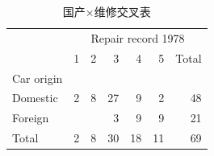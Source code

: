 \begin{table}[htbp]
  \centering
  \caption{ 国产×维修交叉表 }
  \label{tab:tab2d}
  \small
  \begin{tabular}{lllllll}
    \toprule
    \multicolumn{1}{c}{} &
      \multicolumn{6}{c}{Repair record 1978} \\
    \multicolumn{1}{c}{} &
      \multicolumn{1}{r}{1} &
      \multicolumn{1}{r}{2} &
      \multicolumn{1}{r}{3} &
      \multicolumn{1}{r}{4} &
      \multicolumn{1}{r}{5} &
      \multicolumn{1}{r}{Total} \\
    \midrule
    \multicolumn{1}{l}{Car origin} &
      \multicolumn{1}{r}{} &
      \multicolumn{1}{r}{} &
      \multicolumn{1}{r}{} &
      \multicolumn{1}{r}{} &
      \multicolumn{1}{r}{} &
      \multicolumn{1}{r}{} \\
    \multicolumn{1}{l}{\hspace{1em}Domestic} &
      \multicolumn{1}{r}{2} &
      \multicolumn{1}{r}{8} &
      \multicolumn{1}{r}{27} &
      \multicolumn{1}{r}{9} &
      \multicolumn{1}{r}{2} &
      \multicolumn{1}{r}{48} \\
    \multicolumn{1}{l}{\hspace{1em}Foreign} &
      \multicolumn{1}{r}{} &
      \multicolumn{1}{r}{} &
      \multicolumn{1}{r}{3} &
      \multicolumn{1}{r}{9} &
      \multicolumn{1}{r}{9} &
      \multicolumn{1}{r}{21} \\
    \multicolumn{1}{l}{\hspace{1em}Total} &
      \multicolumn{1}{r}{2} &
      \multicolumn{1}{r}{8} &
      \multicolumn{1}{r}{30} &
      \multicolumn{1}{r}{18} &
      \multicolumn{1}{r}{11} &
      \multicolumn{1}{r}{69} \\
    \bottomrule
  \end{tabular}
\end{table}
